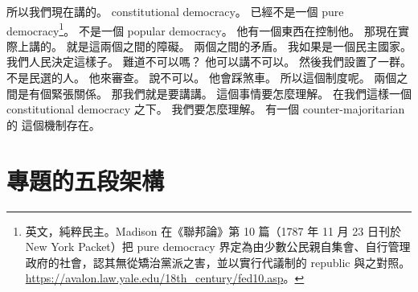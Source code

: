 \hypertarget{w01:cue:364}{}所以我們現在講的。
\hypertarget{w01:cue:365}{}constitutional democracy。
\hypertarget{w01:cue:366}{}已經不是一個
\hypertarget{w01:cue:367}{}pure democracy\footnote{英文，純粹民主。Madison 在《聯邦論》第 10 篇（1787 年 11 月 23 日刊於 New York Packet）把 pure democracy 界定為由少數公民親自集會、自行管理政府的社會，認其無從矯治黨派之害，並以實行代議制的 republic 與之對照。\url{https://avalon.law.yale.edu/18th_century/fed10.asp}。}。
\hypertarget{w01:cue:368}{}不是一個 popular democracy。
\hypertarget{w01:cue:369}{}他有一個東西在控制他。
\hypertarget{w01:cue:370}{}那現在實際上講的。
\hypertarget{w01:cue:371}{}就是這兩個之間的障礙。
\hypertarget{w01:cue:372}{}兩個之間的矛盾。
\hypertarget{w01:cue:373}{}我如果是一個民主國家。
\hypertarget{w01:cue:374}{}我們人民決定這樣子。
\hypertarget{w01:cue:375}{}難道不可以嗎？
\hypertarget{w01:cue:376}{}他可以講不可以。
\hypertarget{w01:cue:377}{}然後我們設置了一群。
\hypertarget{w01:cue:378}{}不是民選的人。
\hypertarget{w01:cue:379}{}他來審查。
\hypertarget{w01:cue:380}{}說不可以。
\hypertarget{w01:cue:381}{}他會踩煞車。
\hypertarget{w01:cue:382}{}所以這個制度呢。
\hypertarget{w01:cue:383}{}兩個之間是有個緊張關係。
\hypertarget{w01:cue:384}{}那我們就是要講講。
\hypertarget{w01:cue:385}{}這個事情要怎麼理解。
\hypertarget{w01:cue:386}{}在我們這樣一個
\hypertarget{w01:cue:387}{}constitutional democracy 之下。
\hypertarget{w01:cue:388}{}我們要怎麼理解。
\hypertarget{w01:cue:389}{}有一個
\hypertarget{w01:cue:390}{}counter-majoritarian 的
\hypertarget{w01:cue:391}{}這個機制存在。

\section{專題的五段架構}


